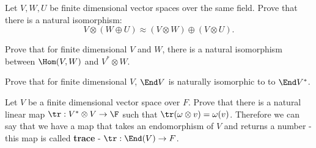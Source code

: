 \begin{prob}
  Let $V, W, U$ be finite dimensional vector spaces over the same field. Prove that there is a natural isomorphism:
  $$V\otimes(W\oplus U)\approx (V\otimes W) \oplus (V\otimes U).$$
\end{prob}

\begin{prob}
  Prove that for finite dimensional $V$ and $W$, there is a natural isomorphism between $\Hom(V,W)$ and $V^*\otimes W$.
\end{prob}

\begin{prob}
  Prove that for finite dimensional $V$, $\End V$ is naturally isomorphic to to $\End V^*$.
\end{prob}

\begin{prob}
  Let $V$ be a finite dimensional vector space over $F$. Prove that there is a natural linear map $\tr : V^*\otimes V\to \F$ such that $\tr(\omega\otimes v)=\omega(v)$. Therefore we can say
  that we have a map that takes an endomorphism of $V$ and returns a number - this map is called \textbf{trace} - $\tr : \End(V)\to F$.
\end{prob}



%
%
%


